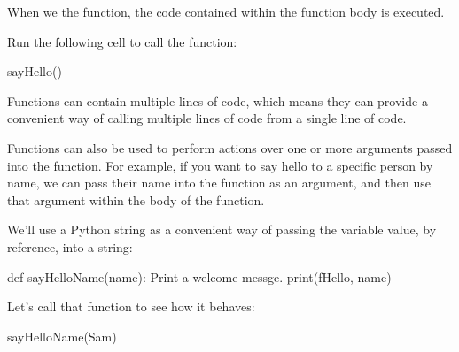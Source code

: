 \documentclass[letterpaper,10pt,english]{sphinxmanual}
\begin{document}
When we  the function, the code contained within the function body is executed.

Run the following cell to call the function:

{
\begin{sphinxVerbatim}[commandchars=\\\{\}]
\llap{\color{nbsphinxin}[ ]:\,\hspace{\fboxrule}\hspace{\fboxsep}}sayHello()
\end{sphinxVerbatim}
}

Functions can contain multiple lines of code, which means they can provide a convenient way of calling multiple lines of code from a single line of code.

Functions can also be used to perform actions over one or more arguments passed into the function. For example, if you want to say hello to a specific person by name, we can pass their name into the function as an argument, and then use that argument within the body of the function.

We’ll use a Python \sphinxhyphen{}string as a convenient way of passing the variable value, by reference, into a string:

{
\begin{sphinxVerbatim}[commandchars=\\\{\}]
\llap{\color{nbsphinxin}[ ]:\,\hspace{\fboxrule}\hspace{\fboxsep}}def sayHelloName(name):
    \PYGZdq{}\PYGZdq{}\PYGZdq{}Print a welcome messge.\PYGZdq{}\PYGZdq{}\PYGZdq{}
    print(f\PYGZdq{}Hello, \PYGZob{}name\PYGZcb{}\PYGZdq{})
\end{sphinxVerbatim}
}

Let’s call that function to see how it behaves:

{
\begin{sphinxVerbatim}[commandchars=\\\{\}]
\llap{\color{nbsphinxin}[ ]:\,\hspace{\fboxrule}\hspace{\fboxsep}}sayHelloName(\PYGZdq{}Sam\PYGZdq{})
\end{sphinxVerbatim}
}
\end{document}
